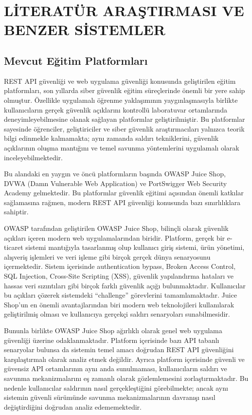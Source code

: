 \section{LİTERATÜR ARAŞTIRMASI VE BENZER SİSTEMLER}
\label{bolum3}

\subsection{Mevcut Eğitim Platformları}
\label{mevcut-e-itim-platformlar}

REST API güvenliği ve web uygulama güvenliği konusunda geliştirilen eğitim platformları, son yıllarda siber güvenlik eğitim süreçlerinde önemli bir yere sahip olmuştur. Özellikle uygulamalı öğrenme yaklaşımının yaygınlaşmasıyla birlikte kullanıcıların gerçek güvenlik açıklarını kontrollü laboratuvar ortamlarında deneyimleyebilmesine olanak sağlayan platformlar geliştirilmiştir. Bu platformlar sayesinde öğrenciler, geliştiriciler ve siber güvenlik araştırmacıları yalnızca teorik bilgi edinmekle kalmamakta; aynı zamanda saldırı tekniklerini, güvenlik açıklarının oluşma mantığını ve temel savunma yöntemlerini uygulamalı olarak inceleyebilmektedir.

Bu alandaki en yaygın ve öncü platformların başında OWASP Juice Shop, DVWA (Damn Vulnerable Web Application) ve PortSwigger Web Security Academy gelmektedir. Bu platformlar güvenlik eğitimi açısından önemli katkılar sağlamasına rağmen, modern REST API güvenliği konusunda bazı sınırlılıklara sahiptir.

OWASP tarafından geliştirilen OWASP Juice Shop, bilinçli olarak güvenlik açıkları içeren modern web uygulamalarından biridir. Platform, gerçek bir e-ticaret sistemi mantığıyla tasarlanmış olup kullanıcı giriş sistemi, ürün yönetimi, alışveriş işlemleri ve veri işleme gibi birçok gerçek dünya senaryosunu içermektedir. Sistem içerisinde authentication bypass, Broken Access Control, SQL Injection, Cross-Site Scripting (XSS), güvenlik yapılandırma hataları ve hassas veri sızıntıları gibi birçok farklı güvenlik açığı bulunmaktadır. Kullanıcılar bu açıkları çözerek sistemdeki “challenge” görevlerini tamamlamaktadır. Juice Shop’un en önemli avantajlarından biri modern web teknolojileri kullanılarak geliştirilmiş olması ve kullanıcıya gerçekçi saldırı senaryoları sunabilmesidir.

Bununla birlikte OWASP Juice Shop ağırlıklı olarak genel web uygulama güvenliği üzerine odaklanmaktadır. Platform içerisinde bazı API tabanlı senaryolar bulunsa da sistemin temel amacı doğrudan REST API güvenliğini karşılaştırmalı olarak analiz etmek değildir. Ayrıca platform içerisinde güvenli ve güvensiz API ortamlarının aynı anda sunulmaması, kullanıcıların saldırı ve savunma mekanizmalarını eş zamanlı olarak gözlemlemesini zorlaştırmaktadır. Bu nedenle kullanıcılar saldırının nasıl gerçekleştiğini görebilmekte; ancak aynı sistemin güvenli sürümünde savunma mekanizmalarının davranışı nasıl değiştirdiğini doğrudan analiz edememektedir.

